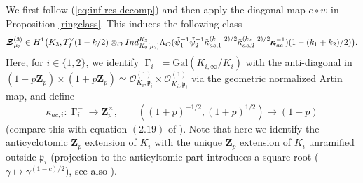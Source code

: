 \documentclass[10pt,letterpaper]{amsart}
\theoremstyle{plain}
\theoremstyle{definition}
\theoremstyle{definition}
\theoremstyle{plain}
\theoremstyle{plain}
\theoremstyle{plain}
\theoremstyle{remark}
\numberwithin{equation}{section}
\newcommand{\ppbar}{\bar{\mathfrak{p}}}
\DeclareMathOperator{\Ga}{\Gamma}
\def\cO{\mathcal O}
\newcommand{\Z}{\mathbf{Z}}
\begin{document}
We first follow (\ref{eq:inf-res-decomp}) and then apply the diagonal map $e\circ w$ in Proposition \ref{ringclass}. This induces the  following class
\begin{equation}\label{eq:big-5}
\boldsymbol{\mathcal{Z}}^{(3)}_{\mu_3}\in 
H^1\bigl(K_3,T_f^\vee(1-k/2)\otimes_\cO{\rm Ind}_{K_0[\mu_3]}^{K_3}\Lambda_\cO(\tilde{\psi}_1^{-1}\tilde{\psi}_2^{-1}\tilde{\kappa}_{\rm ac,1}^{(k_1-2)/2}\tilde{\kappa}_{\rm ac,2}^{(k_2-2)/2}\boldsymbol{\kappa}_{\rm ac}^{-1})(1-(k_1+k_2)/2)\bigr).
\end{equation}
Here, for $i\in\{1,2\}$, we identify $\Ga_i^{-}=\text{Gal}(K_{i,\infty}^{-}/K_i)$ with the anti-diagonal in $(1+p\Z_p)\times (1+p\Z_p)\simeq \mathcal{O}_{K_i,\mathfrak{p}_i}^{(1)}\times \mathcal{O}_{K_i,\ppbar_i}^{(1)}$  via the geometric normalized Artin map, and define
\[\kappa_{ac,i}:\Ga_i^- \rightarrow \Z_p^{\times}, \quad \quad ((1+p)^{-1/2},(1+p)^{1/2})\mapsto (1+p)\]
(compare this with equation $(2.19)$ of \cite{CD}). 
Note that here we identify the anticyclotomic $\Z_p$ extension of $K_i$ with the unique $\Z_p$ extension of $K_i$ unramified outside $\mathfrak{p}_i$ (projection to the anticyltomic part introduces a square root ($\gamma\mapsto \gamma^{(1-c)/2}$), see also \cite[p.636]{Hida-Big-Galois}). 
\end{document}
